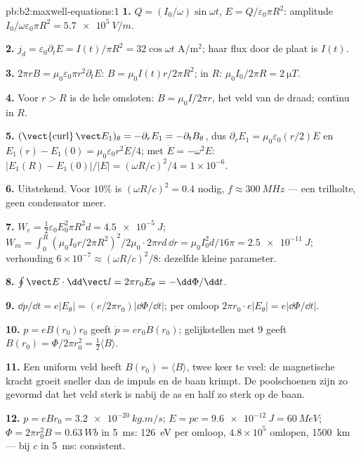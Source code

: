\begin{solution}{pb:b2:maxwell-equations:1}
\textbf{1.} $Q = (I_0/\omega)\sin\omega t$, $E = Q/\varepsilon_0\pi R^2$:
amplitude $I_0/\omega\varepsilon_0
\pi R^2 = \qty{5.7e5}{V/m}$.

\textbf{2.} $j_d = \varepsilon_0\partial_tE = I(t)/\pi R^2 = 32\cos\omega t$
A/m$^2$; haar flux door de plaat is $I(t)$.

\textbf{3.} $2\pi rB = \mu_0\varepsilon_0\pi r^2\partial_tE$:
$B = \mu_0I(t)r/2\pi R^2$; in $R$: $\mu_0I_0/2\pi R = \qty{2}{\micro T}$.

\textbf{4.} Voor $r > R$ is de hele  omsloten:
$B =
\mu_0I/2\pi r$, het veld van de draad; continu in $R$.

\textbf{5.}
$(\operatorname{\vect{curl}}\vect E_1)_\theta = -\partial_rE_1 = -\partial_tB_\theta$,
dus $\partial_rE_1
= \mu_0\varepsilon_0(r/2)\ddot E$ en
$E_1(r) - E_1(0) = \mu_0\varepsilon_0r^2\ddot E/4$; met
$\ddot E = -\omega^2E$:
$|E_1(R) - E_1(0)|/|E| = (\omega R/c)^2/4 = 1 \times 10^{-6}$.

\textbf{6.} Uitstekend. Voor $10\%$ is $(\omega R/c)^2 = 0.4$ nodig,
$f \approx \qty{300}{MHz}$ --- een trilholte, geen condensator meer.

\textbf{7.} $W_e = \tfrac12\varepsilon_0E_0^2\pi R^2d = \qty{4.5e-5}{J}$;
$W_m = \int_0^R(\mu_0I_0r/
2\pi R^2)^2/2\mu_0\cdot2\pi rd\,\dd r = \mu_0I_0^2d/16\pi = \qty{2.5e-11}{J}$;
verhouding $6 \times
10^{-7} \approx (\omega R/c)^2/8$: dezelfde kleine
parameter.

\textbf{8.} $\oint\vect E\cdot\dd\vect l = 2\pi r_0E_\theta = -\dd\Phi/\dd t$.

\textbf{9.} $\dd p/\dd t = e|E_\theta| = (e/2\pi r_0)|\dd\Phi/\dd t|$; per
omloop $2\pi r_0\cdot e|E_\theta| = e|\dd\Phi/\dd t|$.

\textbf{10.} $p = eB(r_0)r_0$ geeft $\dot p = er_0\dot B(r_0)$;
gelijkstellen met 9 geeft
$B(r_0) = \Phi/2\pi r_0^2 = \tfrac12\langle B\rangle$.

\textbf{11.} Een uniform veld heeft $B(r_0) = \langle B\rangle$, twee keer
te veel: de magnetische kracht groeit sneller dan de impuls en de baan
krimpt. De poolschoenen zijn zo gevormd dat het veld sterk is nabij de as en
half zo sterk op de baan.

\textbf{12.} $p = eBr_0 = \qty{3.2e-20}{kg.m/s}$;
$E = pc = \qty{9.6e-12}{J} = \qty{60}{MeV}$;
$\Phi = 2\pi r_0^2B = \qty{0.63}{Wb}$ in \qty{5}{ms}: \qty{126}{eV} per
omloop, $4.8 \times
10^5$ omlopen, \qty{1500}{km} --- bij $c$ in
\qty{5}{ms}: consistent.


\end{solution}
